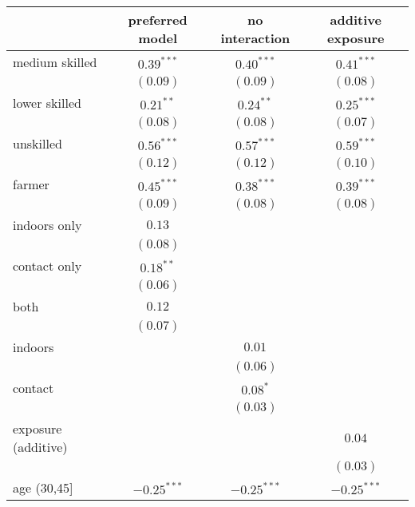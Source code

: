 
\begin{table}
\begin{center}
\begin{tabular}{l c c c}
\hline
 & preferred model & no interaction & additive exposure \\
\hline
medium skilled      & $0.39^{***}$  & $0.40^{***}$  & $0.41^{***}$  \\
                    & $(0.09)$      & $(0.09)$      & $(0.08)$      \\
lower skilled       & $0.21^{**}$   & $0.24^{**}$   & $0.25^{***}$  \\
                    & $(0.08)$      & $(0.08)$      & $(0.07)$      \\
unskilled           & $0.56^{***}$  & $0.57^{***}$  & $0.59^{***}$  \\
                    & $(0.12)$      & $(0.12)$      & $(0.10)$      \\
farmer              & $0.45^{***}$  & $0.38^{***}$  & $0.39^{***}$  \\
                    & $(0.09)$      & $(0.08)$      & $(0.08)$      \\
indoors only        & $0.13$        &               &               \\
                    & $(0.08)$      &               &               \\
contact only        & $0.18^{**}$   &               &               \\
                    & $(0.06)$      &               &               \\
both                & $0.12$        &               &               \\
                    & $(0.07)$      &               &               \\
indoors             &               & $0.01$        &               \\
                    &               & $(0.06)$      &               \\
contact             &               & $0.08^{*}$    &               \\
                    &               & $(0.03)$      &               \\
exposure (additive) &               &               & $0.04$        \\
                    &               &               & $(0.03)$      \\
age (30,45]         & $-0.25^{***}$ & $-0.25^{***}$ & $-0.25^{***}$ \\

\end{tabular}
\end{center}
\end{table}
